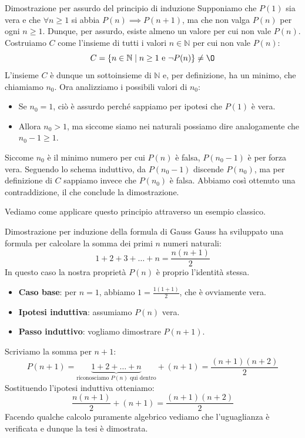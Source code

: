 \documentclass[12pt]{report}
\newcommand{\N}{\mathbb{N}}
\begin{document}
	\begin{dimostrazione}{Dimostrazione per assurdo del principio di induzione}{}
		Supponiamo che $P(1)$ sia vera e che $\forall n \ge 1$ si abbia $P(n) \implies P(n+1)$, ma che non valga $P(n)$ per ogni $n \ge 1$.
		Dunque, per assurdo, esiste almeno un valore per cui non vale $P(n)$.
		Costruiamo $C$ come l'insieme di tutti i valori $n \in \N$ per cui non vale $P(n)$:
		\[
		C = \{n \in \N \mid n \ge 1 \text{ e } \neg P(n)\} \neq \O
		\]
		L'insieme $C$ è dunque un sottoinsieme di $\N$ e, per definizione, ha un minimo, che chiamiamo $n_0$.
		Ora analizziamo i possibili valori di $n_0$:
		\begin{itemize}
			\item Se $n_0 = 1$, ciò è assurdo perché sappiamo per ipotesi che $P(1)$ è vera.
			\item Allora $n_0 > 1$, ma siccome siamo nei naturali possiamo dire analogamente che $n_0 - 1 \ge 1$.
		\end{itemize}
		Siccome $n_0$ è il minimo numero per cui $P(n)$ è falsa, $P(n_0 - 1)$ è per forza vera.
		Seguendo lo schema induttivo, da $P(n_0 - 1)$ discende $P(n_0)$, ma per definizione di $C$ sappiamo invece che $P(n_0)$ è falsa.
		Abbiamo così ottenuto una contraddizione, il che conclude la dimostrazione.
	\end{dimostrazione}
	
	Vediamo come applicare questo principio attraverso un esempio classico.
	
	\begin{osservazione}{Dimostrazione per induzione della formula di Gauss}{}
		Gauss ha sviluppato una formula per calcolare la somma dei primi $n$ numeri naturali:
		\[
		1 + 2 + 3 + \dots + n = \frac{n(n+1)}{2}
		\]
		In questo caso la nostra proprietà $P(n)$ è proprio l'identità stessa.
		\begin{itemize}
			\item \textbf{Caso base}: per $n = 1$, abbiamo $1 = \frac{1(1+1)}{2}$, che è ovviamente vera.
			\item \textbf{Ipotesi induttiva}: assumiamo $P(n)$ vera.
			\item \textbf{Passo induttivo}: vogliamo dimostrare $P(n+1)$.
		\end{itemize}
		Scriviamo la somma per $n+1$:
		\[
		P(n+1) = \underbrace{1 + 2 + \dots + n}_{\text{riconosciamo } P(n) \text{ qui dentro}} + (n+1) = \frac{(n+1)(n+2)}{2}
		\]
		Sostituendo l'ipotesi induttiva otteniamo:
		\[
		\frac{n(n+1)}{2} + (n+1) = \frac{(n+1)(n+2)}{2}
		\]
		Facendo qualche calcolo puramente algebrico vediamo che l'uguaglianza è verificata e dunque la tesi è dimostrata.
	\end{osservazione}
	
\end{document}
